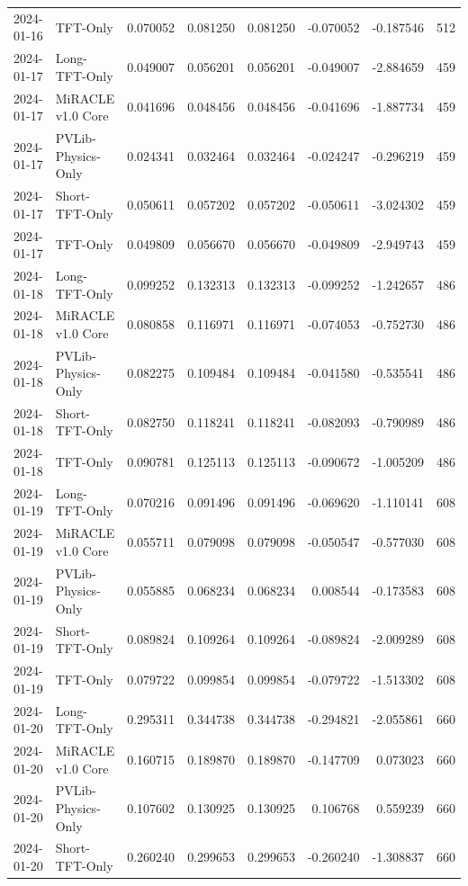 \begin{tabular}{llrrrrrr}
2024-01-16 & TFT-Only & 0.070052 & 0.081250 & 0.081250 & -0.070052 & -0.187546 & 512 \\
2024-01-17 & Long-TFT-Only & 0.049007 & 0.056201 & 0.056201 & -0.049007 & -2.884659 & 459 \\
2024-01-17 & MiRACLE v1.0 Core & 0.041696 & 0.048456 & 0.048456 & -0.041696 & -1.887734 & 459 \\
2024-01-17 & PVLib-Physics-Only & 0.024341 & 0.032464 & 0.032464 & -0.024247 & -0.296219 & 459 \\
2024-01-17 & Short-TFT-Only & 0.050611 & 0.057202 & 0.057202 & -0.050611 & -3.024302 & 459 \\
2024-01-17 & TFT-Only & 0.049809 & 0.056670 & 0.056670 & -0.049809 & -2.949743 & 459 \\
2024-01-18 & Long-TFT-Only & 0.099252 & 0.132313 & 0.132313 & -0.099252 & -1.242657 & 486 \\
2024-01-18 & MiRACLE v1.0 Core & 0.080858 & 0.116971 & 0.116971 & -0.074053 & -0.752730 & 486 \\
2024-01-18 & PVLib-Physics-Only & 0.082275 & 0.109484 & 0.109484 & -0.041580 & -0.535541 & 486 \\
2024-01-18 & Short-TFT-Only & 0.082750 & 0.118241 & 0.118241 & -0.082093 & -0.790989 & 486 \\
2024-01-18 & TFT-Only & 0.090781 & 0.125113 & 0.125113 & -0.090672 & -1.005209 & 486 \\
2024-01-19 & Long-TFT-Only & 0.070216 & 0.091496 & 0.091496 & -0.069620 & -1.110141 & 608 \\
2024-01-19 & MiRACLE v1.0 Core & 0.055711 & 0.079098 & 0.079098 & -0.050547 & -0.577030 & 608 \\
2024-01-19 & PVLib-Physics-Only & 0.055885 & 0.068234 & 0.068234 & 0.008544 & -0.173583 & 608 \\
2024-01-19 & Short-TFT-Only & 0.089824 & 0.109264 & 0.109264 & -0.089824 & -2.009289 & 608 \\
2024-01-19 & TFT-Only & 0.079722 & 0.099854 & 0.099854 & -0.079722 & -1.513302 & 608 \\
2024-01-20 & Long-TFT-Only & 0.295311 & 0.344738 & 0.344738 & -0.294821 & -2.055861 & 660 \\
2024-01-20 & MiRACLE v1.0 Core & 0.160715 & 0.189870 & 0.189870 & -0.147709 & 0.073023 & 660 \\
2024-01-20 & PVLib-Physics-Only & 0.107602 & 0.130925 & 0.130925 & 0.106768 & 0.559239 & 660 \\
2024-01-20 & Short-TFT-Only & 0.260240 & 0.299653 & 0.299653 & -0.260240 & -1.308837 & 660 \\

\end{tabular}
